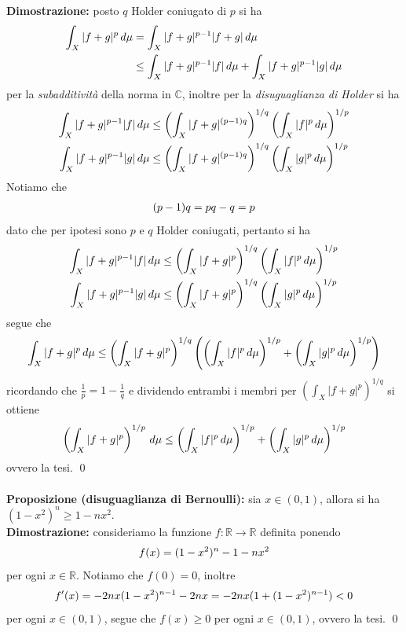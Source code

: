\documentclass{article}
\numberwithin{equation}{subsection}
\begin{document}
\textbf{Dimostrazione:} posto $q$ Holder coniugato di $p$ si ha 
\begin{align*}
    \int_X |f + g|^p \, d\mu &= \int_X |f + g|^{p - 1}|f + g| \, d\mu \notag \\
    &\leq \int_X |f + g|^{p - 1}|f| \, d\mu + \int_X |f + g|^{p - 1}|g| \, d\mu \notag
\end{align*}
per la \textit{subadditività} della norma in $\mathbb{C}$, inoltre per la \textit{disuguaglianza di Holder} si ha
\begin{align*}
    \int_X |f + g|^{p - 1}|f| \, d\mu &\leq \left(\int_X |f + g|^{(p - 1)q}\right)^{1/q}\left(\int_X |f|^p \, d\mu\right)^{1/p} \notag \\
    \int_X |f + g|^{p - 1}|g| \, d\mu &\leq \left(\int_X |f + g|^{(p - 1)q}\right)^{1/q}\left(\int_X |g|^p \, d\mu\right)^{1/p} \notag
\end{align*}
Notiamo che 
\begin{align*}
    (p - 1)q = pq - q = p \notag
\end{align*}
dato che per ipotesi sono $p$ e $q$ Holder coniugati, pertanto si ha 
\begin{align*}
    \int_X |f + g|^{p - 1}|f| \, d\mu &\leq \left(\int_X |f + g|^p\right)^{1/q}\left(\int_X |f|^p \, d\mu\right)^{1/p} \notag \\
    \int_X |f + g|^{p - 1}|g| \, d\mu &\leq \left(\int_X |f + g|^p\right)^{1/q}\left(\int_X |g|^p \, d\mu\right)^{1/p} \notag
\end{align*}
segue che 
\begin{align*}
    \int_X |f + g|^p \, d\mu \leq \left(\int_X |f + g|^p\right)^{1/q}\left(\left(\int_X |f|^p \, d\mu\right)^{1/p} + \left(\int_X |g|^p \, d\mu\right)^{1/p}\right) \notag
\end{align*}
ricordando che $\frac{1}{p} = 1 - \frac{1}{q}$ e dividendo entrambi i membri per $\left(\int_X |f + g|^p\right)^{1/q}$ si ottiene 
\begin{align*}
    \left(\int_X |f + g|^p\right)^{1/p} \, d\mu \leq \left(\int_X |f|^p \, d\mu\right)^{1/p} + \left(\int_X |g|^p \, d\mu\right)^{1/p} \notag
\end{align*}
ovvero la tesi. \qed \\ \\
\textbf{Proposizione (disuguaglianza di Bernoulli):} sia $x \in (0, 1)$, allora si ha $(1 - x^2)^n \geq 1 - nx^2$. \\

\textbf{Dimostrazione:} consideriamo la funzione $f : \mathbb{R} \longrightarrow \mathbb{R}$ definita ponendo
\begin{align*}
    f(x) = (1 - x^2)^n - 1 - nx^2 \notag
\end{align*}
per ogni $x \in \mathbb{R}$. Notiamo che $f(0) = 0$, inoltre 
\begin{align*}
    f'(x) = -2nx(1 - x^2)^{n - 1} - 2nx = - 2nx(1 + (1 - x^2)^{n - 1}) < 0 \notag
\end{align*}
per ogni $x \in (0, 1)$, segue che $f(x) \geq 0$ per ogni $x \in (0, 1)$, ovvero la tesi. \qed
\end{document}
